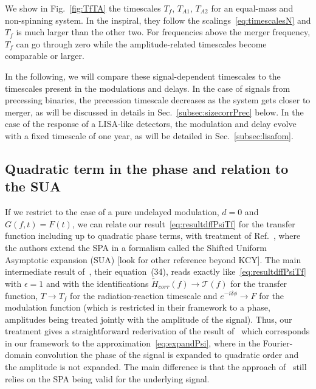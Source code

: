 \documentclass[aps,showpacs,twocolumn,
prd,superscriptaddress,nofootinbib]{revtex4-1}
\newcommand\calT{{\mathcal{T}}}
\newcommand{\Tf}{T_{f}}
\newcommand{\SM}[1]{{\color{Red} #1}}
\newcommand{\jgb}[1]{{\color{DarkGreen} #1}}
\begin{document}
We show in Fig.~\ref{fig:TfTA} the timescales $\Tf$, $T_{A1}$, $T_{A2}$ for an equal-mass and non-spinning system. In the inspiral, they follow the scalings~\eqref{eq:timescalesN} and $\Tf$ is much larger than the other two. For frequencies above the merger frequency, $\Tf$ can go through zero while the amplitude-related timescales become comparable or larger.

In the following, we will compare these signal-dependent timescales to the timescales present in the modulations and delays. In the case of signals from precessing binaries, the precession timescale decreases as the system gets closer to merger, as will be discussed in details in Sec.~\ref{subsec:sizecorrPrec} below. In the case of the response of a LISA-like detectors, the modulation and delay evolve with a fixed timescale of one year, as will be detailed in Sec.~\ref{subsec:lisafom}.


\subsection{Quadratic term in the phase and relation to the SUA}
\label{subsec:resumquadphase}

If we restrict to the case of a pure undelayed modulation, $d=0$ and $G(f,t) = F(t)$, we can relate our result~\eqref{eq:resultdffPsiTf} \jgb{for the transfer function including up to quadratic phase terms, with treatment} of Ref.~\cite{KCY14}, where the authors extend the SPA in a formalism called the Shifted Uniform Asymptotic expansion (SUA) \SM{[look for other reference beyond KCY]}.
The main intermediate result of~\cite{KCY14}, their equation~(34), reads exactly like~\eqref{eq:resultdffPsiTf} with $\epsilon=1$ and with the identifications $\tilde{H}_{corr}(f)\rightarrow \calT(f)$ for the transfer function, $T\rightarrow \Tf$ for the radiation-reaction timescale and $e^{-i\delta\phi} \rightarrow F$ for the modulation function (which is restricted in their framework to a phase, amplitudes being treated jointly with the amplitude of the signal). Thus, our treatment gives a straightforward rederivation of the result of~\cite{KCY14} which corresponds in our framework to the approximation~\eqref{eq:expandPsi}, where in the Fourier-domain convolution the phase of the signal is expanded to quadratic order and the amplitude is not expanded. The main difference is that the approach of~\cite{KCY14} still relies on the SPA being valid for the underlying signal.
\end{document}
